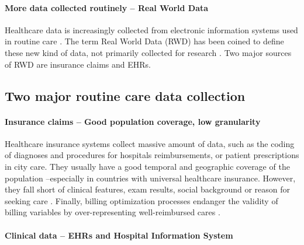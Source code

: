 \documentclass[french,12pt,twoside,a4paper]{book}
\begin{document}
\begin{background_box_left}


  \paragraph{More data collected routinely -- Real World Data}%
  \label{subsec:intro:real_world_data}

  Healthcare data is increasingly collected from electronic information systems
  used in routine care
  \citep{jha_use_2009,sheikh_adoption_2014,kim_rate_2017,esdar_diffusion_2019,kanakubo_comparing_2019,liang_adoption_2021,apathy_decade_2021}.
  The term Real World Data (RWD) has been coined to define these new kind of
  data, not primarily collected for research
  \citep{fda_real-world_2021,has_real-world_2021,kent_nice_2022}. Two major
  sources of RWD are insurance claims and EHRs.

  \subsection{Two major routine care data collection}\label{subsec:intro:routine_data}
  \paragraph{Insurance claims -- Good population coverage, low granularity}%
  \label{def:claims}%

  Healthcare insurance systems collect massive amount of data, such as the
  coding of diagnoses and procedures for hospitals reimbursements, or patient
  prescriptions in city care. They usually have a good temporal and geographic
  coverage of the population --especially in countries with universal healthcare
  insurance. However, they fall short of clinical features, exam results, social
  background or reason for seeking care \citep{ziegler2022high}. Finally,
  billing optimization processes endanger the validity of billing variables by
  over-representing well-reimbursed cares \citep{juven2013codage}.

  \paragraph{Clinical data -- EHRs and Hospital Information System}\label{def:ehr_his}


\end{background_box_left}
\end{document}
